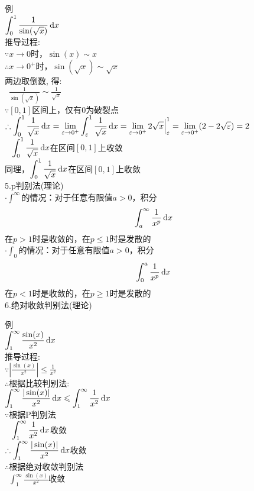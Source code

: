 例\\
\phantom{例}$\displaystyle\int_0^1\frac{1}{\sin(\sqrt{x})}\mathop{}\!\mathrm{d} x$\\
推导过程:\\
$\because x\to 0$时，$\sin(x)\sim x$\\
$\therefore x\to 0^+$时，$\sin(\sqrt{x})\sim\sqrt{x}$\\
\phantom{$\therefore$}两边取倒数, 得:\\
$\displaystyle\phantom{\therefore}\frac{1}{\sin(\sqrt{x})}\sim\frac{1}{\sqrt{x}}$\\
$\because[0,1]$区间上，仅有$0$为破裂点\\
$\displaystyle\therefore\int_0^1\frac{1}{\sqrt{x}}\mathop{}\!\mathrm{d} x=\lim_{\varepsilon\to 0^+}\int_{\varepsilon}^1\frac{1}{\sqrt{x}}\mathop{}\!\mathrm{d} x=\lim_{\varepsilon\to 0^+}2\sqrt{x}\Big|_{\varepsilon}^1=\lim_{\varepsilon\to 0^+}(2-2\sqrt{\varepsilon})=2$\\
$\displaystyle\phantom{\therefore}\int_0^1\frac{1}{\sqrt{x}}\mathop{}\!\mathrm{d} x$在区间$[0,1]$上收敛\\
同理，$\displaystyle\int_0^1\frac{1}{\sqrt{x}}\mathop{}\!\mathrm{d} x$在区间$[0,1]$上收敛\\[4ex]

5.p判别法(理论)\\
$\displaystyle\cdot\int^{\infty}$的情况：对于任意有限值$a>0$，积分
\[\int_a^{\infty}\frac{1}{x^p}\mathop{}\!\mathrm{d} x\]
\phantom{$\cdot$}在$p>1$时是收敛的，在$p\leqslant 1$时是发散的\\

$\displaystyle\cdot\int_0$的情况：对于任意有限值$a>0$，积分
\[\int_0^a\frac{1}{x^p}\mathop{}\!\mathrm{d} x\]
\phantom{$\cdot$}在$p<1$时是收敛的，在$p\geqslant 1$时是发散的\\[4ex]

6.绝对收敛判别法(理论)
\begin{center}
\end{center}

例\\
\phantom{例}$\displaystyle\int_1^{\infty}\frac{\sin(x)}{x^2}\mathop{}\!\mathrm{d} x$\\
推导过程:\\
$\displaystyle\because|\frac{\sin(x)}{x^2}|\leqslant\frac{1}{x^2}$\\
$\therefore$根据比较判别法:\\
$\displaystyle\int_1^{\infty}\frac{|\sin(x)|}{x^2}\mathop{}\!\mathrm{d} x\leqslant\int_1^{\infty}\frac{1}{x^2}\mathop{}\!\mathrm{d} x$\\
$\because$根据P判别法\\
$\displaystyle\phantom{\because}\int_1^{\infty}\frac{1}{x^2}\mathop{}\!\mathrm{d} x$收敛\\[1ex]
$\displaystyle\therefore\int_1^{\infty}\frac{|\sin(x)|}{x^2}\mathop{}\!\mathrm{d} x$收敛\\
$\therefore$根据绝对收敛判别法\\
$\displaystyle\phantom{\therefore}\int_1^{\infty}\frac{\sin(x)}{x^2}$收敛

